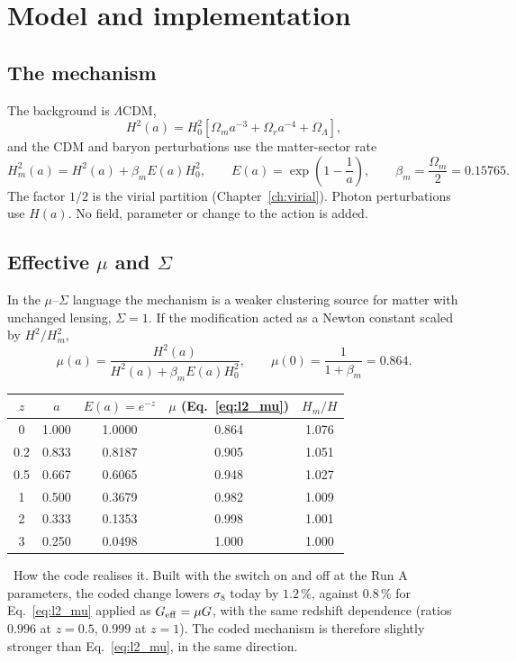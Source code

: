 \section{Model and implementation}
\subsection{The mechanism}
The background is $\Lambda$CDM,
\begin{equation}
H^2(a)=H_0^2\left[\Omega_ma^{-3}+\Omega_ra^{-4}+\Omega_\Lambda\right],
\end{equation}
and the CDM and baryon perturbations use the matter-sector rate
\begin{equation}
H_m^2(a)=H^2(a)+\beta_mE(a)H_0^2,\qquad E(a)=\exp\!\left(1-\frac1a\right),\qquad\beta_m=\frac{\Omega_m}{2}=0.15765 .
\label{eq:l2_Hm}\end{equation}
The factor $1/2$ is the virial partition (Chapter~\ref{ch:virial}). Photon perturbations use $H(a)$. No field, parameter or change to the action is added.

\subsection{Effective $\mu$ and $\Sigma$}
In the $\mu$--$\Sigma$ language the mechanism is a weaker clustering source for matter with unchanged lensing, $\Sigma=1$. If the modification acted as a
Newton constant scaled by $H^2/H_m^2$,
\begin{equation}
\mu(a)=\frac{H^2(a)}{H^2(a)+\beta_mE(a)H_0^2},\qquad \mu(0)=\frac1{1+\beta_m}=0.864 .
\label{eq:l2_mu}\end{equation}
\begin{center}\small
\begin{tabular}{ccccc}\hline
$z$ & $a$ & $E(a)=e^{-z}$ & $\mu$ (Eq.~\ref{eq:l2_mu}) & $H_m/H$\\\hline
0 & 1.000 & 1.0000 & 0.864 & 1.076\\
0.2 & 0.833 & 0.8187 & 0.905 & 1.051\\
0.5 & 0.667 & 0.6065 & 0.948 & 1.027\\
1 & 0.500 & 0.3679 & 0.982 & 1.009\\
2 & 0.333 & 0.1353 & 0.998 & 1.001\\
3 & 0.250 & 0.0498 & 1.000 & 1.000\\\hline
\end{tabular}
\end{center}
\calc\ How the code realises it. Built with the switch on and off at the Run A parameters, the coded change lowers $\sigma_8$ today by $1.2\,\%$, against
$0.8\,\%$ for Eq.~\eqref{eq:l2_mu} applied as $G_{\rm eff}=\mu G$, with the same redshift dependence (ratios $0.996$ at $z=0.5$, $0.999$ at $z=1$). The coded
mechanism is therefore slightly stronger than Eq.~\eqref{eq:l2_mu}, in the same direction.

